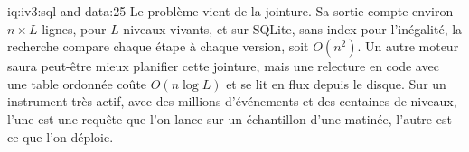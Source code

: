 \begin{solution}{iq:iv3:sql-and-data:25}
Le problème vient de la jointure. Sa sortie compte environ $n \times L$ lignes, pour $L$ niveaux vivants, et sur SQLite, sans index pour l'inégalité, la recherche compare chaque étape à chaque version, soit $O(n^2)$. Un autre moteur saura peut-être mieux planifier cette jointure, mais une relecture en code avec une table ordonnée coûte $O(n \log L)$ et se lit en flux depuis le disque. Sur un instrument très actif, avec des millions d'événements et des centaines de niveaux, l'une est une requête que l'on lance sur un échantillon d'une matinée, l'autre est ce que l'on déploie.

\end{solution}

